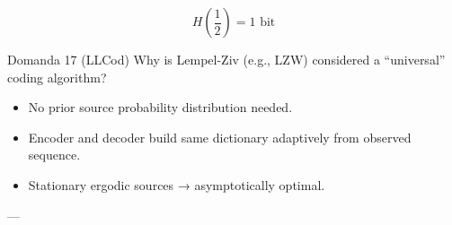 $$
H\left(\frac{1}{2}\right)=1 \text{ bit}
$$




\begin{questionbox}{Domanda 17}
(LLCod) Why is Lempel-Ziv (e.g., LZW) considered a “universal” coding algorithm?
\end{questionbox}


\begin{itemize}
  \item No prior source probability distribution needed.
  \item Encoder and decoder build same dictionary adaptively from observed sequence.
  \item Stationary ergodic sources → asymptotically optimal.
\end{itemize}

---


